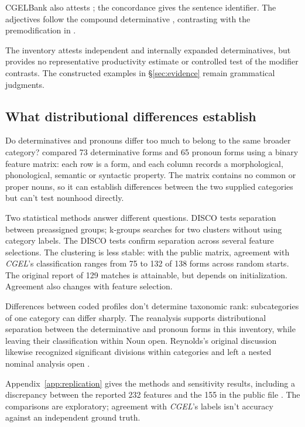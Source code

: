 \documentclass[12pt]{article}
\begin{document}
CGELBank also attests ; the concordance gives the sentence identifier. The adjectives follow the compound determinative , contrasting with the premodification in .

The inventory attests independent and internally expanded determinatives, but provides no representative productivity estimate or controlled test of the modifier contrasts. The constructed examples in §\ref{sec:evidence} remain grammatical judgments.

\subsection{What distributional differences establish}

Do determinatives and pronouns differ too much to belong to the same broader category? \textcite{reynolds2021} compared 73 determinative forms and 65 pronoun forms using a binary feature matrix: each row is a form, and each column records a morphological, phonological, semantic or syntactic property. The matrix contains no common or proper nouns, so it can establish differences between the two supplied categories but can't test nounhood directly.

Two statistical methods answer different questions. DISCO tests separation between preassigned groups; k-groups searches for two clusters without using category labels. The DISCO tests confirm separation across several feature selections. The clustering is less stable: with the public matrix, agreement with \textit{CGEL}'s classification ranges from 75 to 132 of 138 forms across random starts. The original report of 129 matches is attainable, but depends on initialization. Agreement also changes with feature selection.

Differences between coded profiles don't determine taxonomic rank: subcategories of one category can differ sharply. The reanalysis supports distributional separation between the determinative and pronoun forms in this inventory, while leaving their classification within Noun open. Reynolds's original discussion likewise recognized significant divisions within categories and left a nested nominal analysis open \citep{reynolds2021}.

Appendix~\ref{app:replication} gives the methods and sensitivity results, including a discrepancy between the reported 232 features and the 155 in the public file \citep{reynolds2021matrix}. The comparisons are exploratory; agreement with \textit{CGEL}'s labels isn't accuracy against an independent ground truth.
\end{document}

